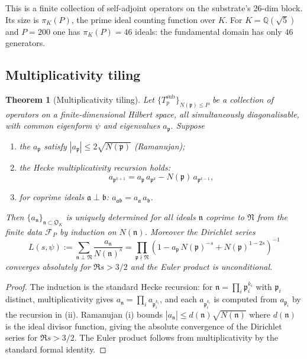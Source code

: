 \documentclass[11pt,a4paper]{article}
\newtheorem{theorem}{Theorem}[section]
\theoremstyle{definition}
\newcommand{\Q}{\mathbb{Q}}
\newcommand{\Tp}{T_p}
\begin{document}
This is a finite collection of self-adjoint operators on the substrate's
26-dim block. Its size is $\pi_K(P)$, the prime ideal counting function over
$K$. For $K=\Q(\sqrt{5})$ and $P=200$ one has $\pi_K(P)=46$ ideals: the
fundamental domain has only $46$ generators.

\subsection{Multiplicativity tiling}
\begin{theorem}[Multiplicativity tiling]\label{thm:mult-tiling}
Let $\{\Tp^{\mathrm{sub}}\}_{N(\mathfrak{p})\le P}$ be a collection of
operators on a finite-dimensional Hilbert space, all simultaneously
diagonalisable, with common eigenform $\psi$ and eigenvalues $a_\mathfrak{p}$.
Suppose
\begin{enumerate}[label=(\roman*)]
\item the $a_\mathfrak{p}$ satisfy $|a_\mathfrak{p}|\le 2\sqrt{N(\mathfrak{p})}$ (Ramanujan);
\item the Hecke multiplicativity recursion holds:
$$
a_{\mathfrak{p}^{k+1}}
= a_\mathfrak{p}\,a_{\mathfrak{p}^k} - N(\mathfrak{p})\,a_{\mathfrak{p}^{k-1}},
$$
\item for coprime ideals $\mathfrak{a}\perp\mathfrak{b}$: $a_{\mathfrak{a}\mathfrak{b}} = a_\mathfrak{a}\,a_\mathfrak{b}$.
\end{enumerate}
Then $\{a_\mathfrak{n}\}_{\mathfrak{n}\subset\mathfrak{O}_K}$ is uniquely
determined for all ideals $\mathfrak{n}$ coprime to $\mathfrak{N}$ from the
finite data $\mathcal{F}_P$ by induction on $N(\mathfrak{n})$. Moreover the
Dirichlet series
$$
L(s,\psi) := \sum_{\mathfrak{n}\perp\mathfrak{N}} \frac{a_\mathfrak{n}}{N(\mathfrak{n})^s}
= \prod_{\mathfrak{p}\nmid\mathfrak{N}}
   \left(1 - a_\mathfrak{p}\,N(\mathfrak{p})^{-s} + N(\mathfrak{p})^{1-2s}\right)^{-1}
$$
converges absolutely for $\Re s > 3/2$ and the Euler product is unconditional.
\end{theorem}

\begin{proof}
The induction is the standard Hecke recursion: for $\mathfrak{n} = \prod_i
\mathfrak{p}_i^{k_i}$ with $\mathfrak{p}_i$ distinct, multiplicativity gives
$a_\mathfrak{n} = \prod_i a_{\mathfrak{p}_i^{k_i}}$, and each $a_{\mathfrak{p}_i^{k_i}}$
is computed from $a_{\mathfrak{p}_i}$ by the recursion in (ii). Ramanujan (i)
bounds $|a_\mathfrak{n}|\le d(\mathfrak{n})\sqrt{N(\mathfrak{n})}$ where
$d(\mathfrak{n})$ is the ideal divisor function, giving the absolute convergence
of the Dirichlet series for $\Re s > 3/2$. The Euler product follows from
multiplicativity by the standard formal identity.
\end{proof}
\end{document}
